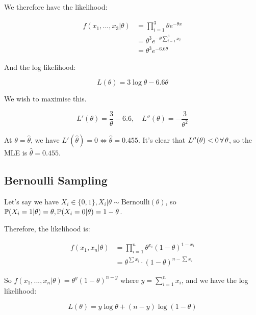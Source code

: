 \documentclass[a4paper]{article}
\begin{document}
                We therefore have the likelihood:

                \begin{align*}
                    f(x_1, ..., x_3 | \theta) & = \prod_{i=1}^3 \theta e^{
                        -\theta x} \\
                    & = \theta^3 e^{-\theta \sum\limits_{i=1}^3 x_i} \\
                    & = \theta^3 e^{-6.6\theta}
                \end{align*}

                And the log likelihood:

                \[
                    L(\theta) = 3\log\theta - 6.6\theta
                \]

                We wish to maximise this.

                \[
                    L'(\theta) = \frac{3}{\theta} - 6.6, \quad L''(\theta) = -
                    \frac{3}{\theta^2}
                \]

                At $\theta = \widehat \theta$, we have $L'(\widehat \theta) = 0
                \iff \widehat \theta = 0.455$. It's clear that $L''(\theta) < 0
                \,\forall\, \theta$, so the MLE is $\widehat \theta = 0.455$.

        \subsection{Bernoulli Sampling}
            Let's say we have $X_i \in \{0, 1\}, X_i | \theta \sim
            \text{Bernoulli}(\theta)$, so $\mathbb{P}(X_i = 1 | \theta) = \theta,
            \mathbb{P}(X_i = 0 | \theta) = 1 - \theta$.

            Therefore, the likelihood is:

            \begin{align*}
                f(x_1, x_n | \theta) & = \prod_{i=1}^n \theta^{x_i} (1 - \theta)
                    ^{1-x_i} \\
                & = \theta^{\sum x_i} \cdot (1 - \theta)^{n - \sum x_i}
            \end{align*}

            So $f(x_1, ..., x_n | \theta) = \theta^y (1 - \theta)^{n - y}$ where
            $y = \sum\limits_{i=1}^n x_i$, and we have the log likelihood:

            \[
                L(\theta) = y\log{\theta} + (n - y)\log(1 - \theta)
            \]
\end{document}
